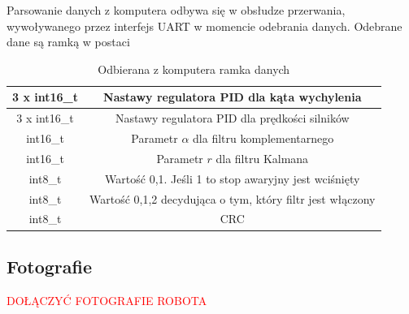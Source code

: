 Parsowanie danych z komputera odbywa się w obsłudze przerwania, wywoływanego przez interfejs UART w momencie odebrania danych. Odebrane dane są ramką w postaci

\begin{table}[h!]
    \centering
    \caption{Odbierana z komputera ramka danych}
    \begin{tabular}{|c|c|}
        \hline
        3 x int16\_t & Nastawy regulatora PID dla kąta wychylenia \\
        \hline
        3 x int16\_t & Nastawy regulatora PID dla prędkości silników \\
        \hline
        int16\_t & Parametr $\alpha$ dla filtru komplementarnego \\
        \hline
        int16\_t & Parametr $r$ dla filtru Kalmana \\
        \hline
        int8\_t & Wartość 0,1. Jeśli 1 to stop awaryjny jest wciśnięty \\
        \hline
        int8\_t & Wartość 0,1,2 decydująca o tym, który filtr jest włączony \\
        \hline
        int8\_t & CRC \\
        \hline
    \end{tabular}
    \label{Ramka wysylana}
\end{table}

\subsection{Fotografie}

\textcolor{red}{DOŁĄCZYĆ FOTOGRAFIE ROBOTA}
